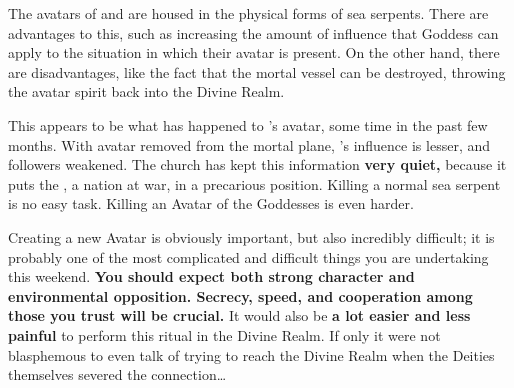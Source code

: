 \documentclass[green]{GL2020}
\begin{document}
\name{\gEbbAvatar{}}

The avatars of \cEbb{} and \cFlow{} are housed in the physical forms of sea serpents. There are advantages to this, such as increasing the amount of influence that Goddess can apply to the situation in which their avatar is present. On the other hand, there are disadvantages, like the fact that the mortal vessel can be destroyed, throwing the avatar spirit back into the Divine Realm. 

This appears to be what has happened to \cEbb{}’s avatar, some time in the past few months. With \cEbb{\their} avatar removed from the mortal plane, \cEbb{}’s influence is lesser, and \cEbb{\their} followers weakened. The church has kept this information \textbf{very quiet,} because it puts the \pShip{}, a nation at war, in a precarious position. Killing a normal sea serpent is no easy task. Killing an Avatar of the Goddesses is even harder.

Creating a new Avatar is obviously important, but also incredibly difficult; it is probably one of the most complicated and difficult things you are undertaking this weekend. \textbf{You should expect both strong character and environmental opposition. Secrecy, speed, and cooperation among those you trust will be crucial.} It would also be \textbf{a lot easier and less painful} to perform this ritual in the Divine Realm. If only it were not blasphemous to even talk of trying to reach the Divine Realm when the Deities themselves severed the connection\ldots{}
\end{document}

